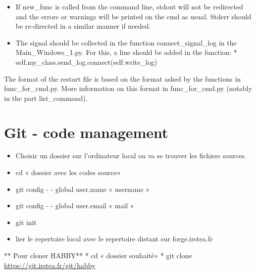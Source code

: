 \documentclass[letterpaper,10pt,english]{sphinxmanual}
\begin{document}
\begin{itemize}
\item {} 
If new\_func is called from the command line, stdout will not be redirected and the errors or warnings will be printed on the cmd as usual.  Stderr should be re-directed in a similar manner if needed.

\item {} 
The signal should be collected in the function connect\_signal\_log in the Main\_Windows\_1.py.  For this, a line should be added in the function:
*       self.my\_class.send\_log.connect(self.write\_log)

\end{itemize}


The format of the restart file is based on the format asked by the functions in func\_for\_cmd.py. More information on this format in func\_for\_cmd.py
(notably in the part list\_command).


\section{Git - code management}
\label{\detokenize{index:git-code-management}}
\begin{itemize}
\item {} 
Choisir un dossier sur l’ordinateur local ou va se trouver les fichiers sources.

\item {} 
cd  « dossier avec les codes source»

\item {} 
git config - - global user.name « username »

\item {} 
git config - - global user.email  « mail »

\item {} 
git init

\item {} 
lier le repertoire local avec le repertoire distant sur forge.irstea.fr

\end{itemize}

** Pour cloner HABBY**
*       cd « dossier souhaité»
*       git clone \url{https://git.irstea.fr/git/habby}
\end{document}
